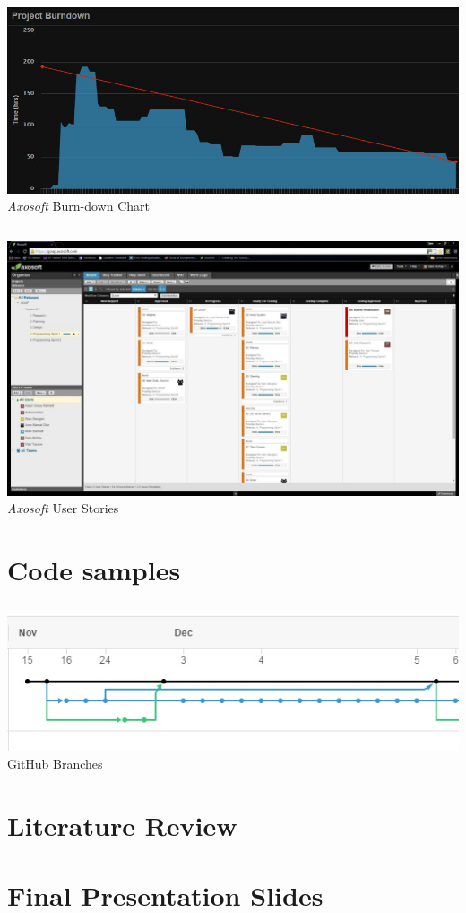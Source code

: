 \documentclass[a4paper]{report}
\begin{document}
\section{}
\subsection{}
	\includegraphics[width=1.0\linewidth]{./appendixImages/AxosoftScreenShot01}
	\textit{Axosoft} Burn-down Chart 
\subsection{}
	\includegraphics[width=1.0\linewidth]{./appendixImages/AxosoftScreenShot02}
	\textit{Axosoft} User Stories
\pagebreak
\section{Code samples}





\pagebreak

\subsection{}
\includegraphics[width=1.0\linewidth]{./appendixImages/GitHubScreenShot01}
GitHub Branches
\pagebreak
\section{Literature Review}

\section{Final Presentation Slides}

\end{document}
